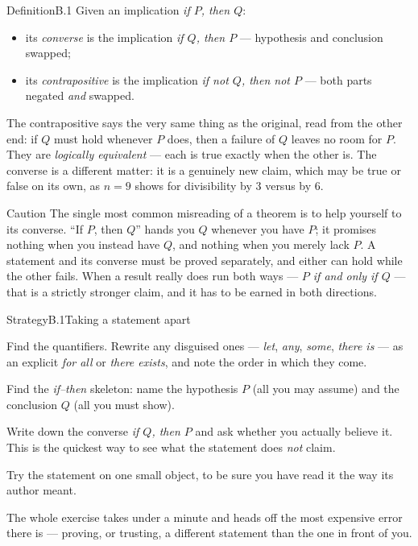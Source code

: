 \documentclass[a4paper,12pt,oneside]{memoir}
\begin{document}
\begin{envdefinition}{Definition}{B.1}{}
Given an implication \emph{if \(P\), then \(Q\)}:
\begin{itemize}
  \item its \emph{converse} is the implication \emph{if \(Q\), then \(P\)} — hypothesis and conclusion swapped;
  \item its \emph{contrapositive} is the implication \emph{if not \(Q\), then not \(P\)} — both parts negated \emph{and} swapped.
\end{itemize}
\end{envdefinition}

The contrapositive says the very same thing as the original, read from the other end: if \(Q\) must hold whenever \(P\) does, then a failure of \(Q\) leaves no room for \(P\). They are \emph{logically equivalent} — each is true exactly when the other is. The converse is a different matter: it is a genuinely new claim, which may be true or false on its own, as \(n = 9\) shows for divisibility by \(3\) versus by \(6\).

\begin{envcaution}{Caution}{}{}
The single most common misreading of a theorem is to help yourself to its converse. “If \(P\), then \(Q\)” hands you \(Q\) whenever you have \(P\); it promises nothing when you instead have \(Q\), and nothing when you merely lack \(P\). A statement and its converse must be proved separately, and either can hold while the other fails. When a result really does run both ways — \emph{\(P\) if and only if \(Q\)} — that is a strictly stronger claim, and it has to be earned in both directions.
\end{envcaution}

\begin{envstrategy}{Strategy}{B.1}{Taking a statement apart}
\begin{steps}
  \item Find the quantifiers. Rewrite any disguised ones — \emph{let}, \emph{any}, \emph{some}, \emph{there is} — as an explicit \emph{for all} or \emph{there exists}, and note the order in which they come.
  \item Find the \emph{if–then} skeleton: name the hypothesis \(P\) (all you may assume) and the conclusion \(Q\) (all you must show).
  \item Write down the converse \emph{if \(Q\), then \(P\)} and ask whether you actually believe it. This is the quickest way to see what the statement does \emph{not} claim.
  \item Try the statement on one small object, to be sure you have read it the way its author meant.
\end{steps}
\begin{informal}
The whole exercise takes under a minute and heads off the most expensive error there is — proving, or trusting, a different statement than the one in front of you.
\end{informal}
\end{envstrategy}
\end{document}
